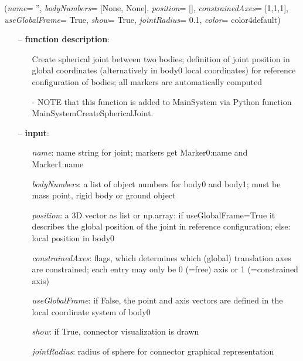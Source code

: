 %
\begin{flushleft}
\label{sec:mainsystemextensions:CreateSphericalJoint}
({\it name}= '', {\it bodyNumbers}= [None, None], {\it position}= [], {\it constrainedAxes}= [1,1,1], {\it useGlobalFrame}= True, {\it show}= True, {\it jointRadius}= 0.1, {\it color}= color4default)
\end{flushleft}
\setlength{\itemindent}{0.7cm}
\begin{itemize}[leftmargin=0.7cm]
\item[--]
{\bf function description}: \vspace{-6pt}
\begin{itemize}[leftmargin=1.2cm]
\setlength{\itemindent}{-0.7cm}
\item[]Create spherical joint between two bodies; definition of joint position in global coordinates (alternatively in body0 local coordinates) for reference configuration of bodies; all markers are automatically computed
\item[]- NOTE that this function is added to MainSystem via Python function MainSystemCreateSphericalJoint.
\end{itemize}
\item[--]
{\bf input}: \vspace{-6pt}
\begin{itemize}[leftmargin=1.2cm]
\setlength{\itemindent}{-0.7cm}
\item[]{\it name}: name string for joint; markers get Marker0:name and Marker1:name
\item[]{\it bodyNumbers}: a list of object numbers for body0 and body1; must be mass point, rigid body or ground object
\item[]{\it position}: a 3D vector as list or np.array: if useGlobalFrame=True it describes the global position of the joint in reference configuration; else: local position in body0
\item[]{\it constrainedAxes}: flags, which determines which (global) translation axes are constrained; each entry may only be 0 (=free) axis or 1 (=constrained axis)
\item[]{\it useGlobalFrame}: if False, the point and axis vectors are defined in the local coordinate system of body0
\item[]{\it show}: if True, connector visualization is drawn
\item[]{\it jointRadius}: radius of sphere for connector graphical representation

\end{itemize}
\end{itemize}
